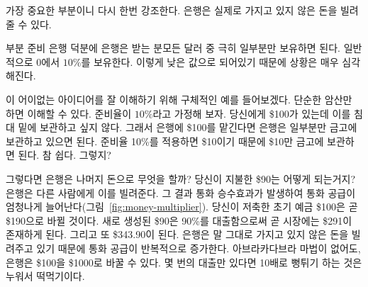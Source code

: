 \begin{comment}
Let me repeat the most important part: banks can lend money that they
don't actually have.
\end{comment}
가장 중요한 부분이니 다시 한번 강조한다.
은행은 실제로 가지고 있지 않은 돈을 빌려줄 수 있다.

\begin{comment}
Thanks to fractional reserve banking, a bank only has to keep a small
\textit{fraction} of every dollar it gets. It's somewhere between $0$ and $10\%$,
usually at the lower end, which makes things even worse.
\end{comment}
부분 준비 은행 덕분에 은행은 받는 분모든 달러 중 극히 일부분만 보유하면 된다. 
일반적으로 $0$에서 $10\%$를 보유한다. 
이렇게 낮은 값으로 되어있기 때문에 상황은 매우 심각해진다.

\begin{comment}
Let's use a concrete example to better understand this crazy idea: A
fraction of $10\%$ will do the trick and we should be able to do all the
calculations in our head. Win-win. So, if you take \$100 to a
bank --- because you don't want to store it under your mattress --- they
only have to keep the agreed upon \textit{fraction} of it. In our example that
would be \$10, because 10\% of \$100 is \$10. Easy, right?
\end{comment}
이 어이없는 아이디어를 잘 이해하기 위해 구체적인 예를 들어보겠다. 
단순한 암산만 하면 이해할 수 있다. 
준비율이 $10\%$라고 가정해 보자.
당신에게  \$100가 있는데 이를 침대 밑에 보관하고 싶지 않다.
그래서 은행에 \$100를 맡긴다면 은행은 일부분만 금고에 보관하고 있으면 된다.
준비율 10\%를 적용하면 \$10이기 때문에 \$10만 금고에 보관하면 된다. 
참 쉽다. 그렇지? 

\begin{comment}
So what do banks do with the rest of the money? What happens to your \$90? They
do what banks do, they lend it to other people. The result is a money multiplier
effect, which increases the money supply in the economy enormously
(Figure~\ref{fig:money-multiplier}). Your initial deposit of \$100 will soon
turn into \$190. By lending a 90\% fraction of the newly created \$90, there
will soon be \$271 in the economy. And \$343.90 after that. The money supply is
recursively increasing, since banks are literally lending money they don't
have~\cite{wiki:money-multiplier}. Without a single Abracadabra, banks magically
transform \$100 into one thousand dollars or more. Turns out 10x is easy. It
only takes a couple of lending rounds.
\end{comment}
그렇다면 은행은 나머지 돈으로 무엇을 할까? 
당신이 지불한 \$90는 어떻게 되는거지? 
은행은 다른 사람에게 이를 빌려준다. 
그 결과 통화 승수효과가 발생하여 통화 공급이 엄청나게 늘어난다(그림~\ref{fig:money-multiplier}). 
당신이 저축한 초기 예금 \$100은 곧 \$190으로 바뀔 것이다. 
새로 생성된 \$90은 90\%를 대출함으로써 곧 시장에는 \$291이 존재하게 된다. 
그리고 또 \$343.90이 된다. 
은행은 말 그대로 가지고 있지 않은 돈을 빌려주고 있기 때문에 통화 공급이 반복적으로 증가한다\cite{wiki:money-multiplier}. 
아브라카다브라 마법이 없어도, 은행은 \$100을 \$1000로 바꿀 수 있다. 
몇 번의 대출만 있다면 10배로 뻥튀기 하는 것은 누워서 떡먹기이다.

